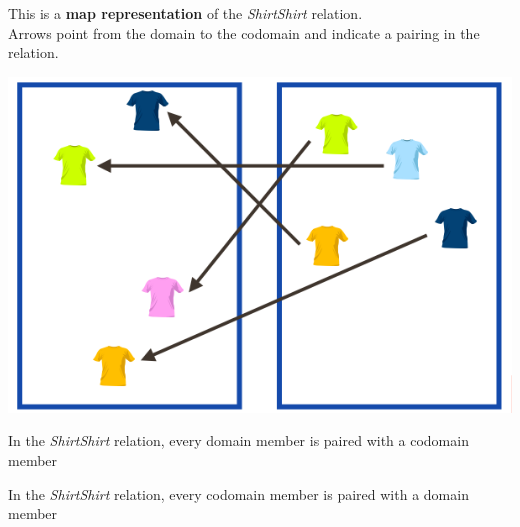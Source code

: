 \documentclass{ximera}
\author{Lee Wayand}
\begin{document}
\begin{exercise}

This is a \textbf{map representation} of the \textit{ShirtShirt} relation. \\


Arrows point from the domain to the codomain and indicate a pairing in the relation.


\begin{image}
\includegraphics{../../pics/func_maps/f_9.png}
\end{image}




\begin{question} 
In the \textit{ShirtShirt} relation, every domain member is paired with a codomain member

\begin{multipleChoice}
\end{multipleChoice}
\end{question}







\begin{question} 
In the \textit{ShirtShirt} relation, every codomain member is paired with a domain member

\begin{multipleChoice}
\end{multipleChoice}
\end{question}








\end{exercise}
\end{document}
